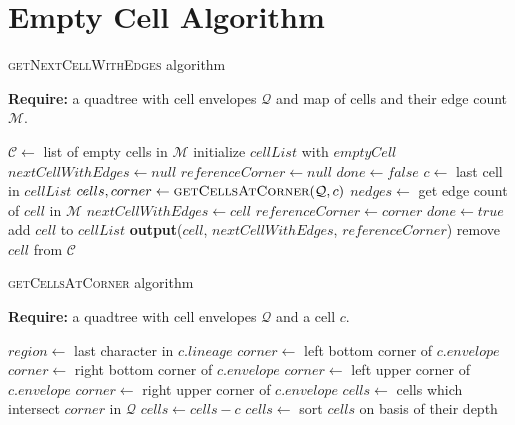 \section{Empty Cell Algorithm}\label{app:emptycells}
\begin{algorithm} \caption{\textsc{getNextCellWithEdges} algorithm}
    \textbf{Require:} a quadtree with cell envelopes $\mathcal Q$ and map of cells and their edge count $\mathcal M$.
    \begin{algorithmic}[1]
        \State $\mathcal C \gets $ list of empty cells in $\mathcal M$
            \State initialize $cellList$ with $emptyCell$ 
            \State $nextCellWithEdges \gets null$
            \State $referenceCorner \gets null$
            \State $done \gets false$
                \State $c \gets $ last cell in $cellList$ 
                \State $cells, corner \gets \textsc{getCellsAtCorner}(\mathcal Q, c)$ 
                    \State $nedges \gets$ get edge count of $cell$ in $\mathcal M$ 
                        \State $nextCellWithEdges \gets cell$
                        \State $referenceCorner \gets corner$
                        \State $done \gets true$
                    \Else
                        \State add $cell$ to $cellList$
                    \EndIf
                \EndFor
            \EndWhile
                \State \textbf{output}($cell$, $nextCellWithEdges$, $referenceCorner$)
                \State remove $cell$ from $\mathcal C$
            \EndFor
        \EndFor
    \EndFunction
    \end{algorithmic}
\end{algorithm}

\begin{algorithm} \caption{\textsc{getCellsAtCorner} algorithm}
    \textbf{Require:} a quadtree with cell envelopes $\mathcal Q$ and a cell $c$.
    \begin{algorithmic}[1]
        \State $region \gets $ last character in $c.lineage$
                \State $corner \gets$ left bottom corner of $c.envelope$
            \EndCase
                \State $corner \gets$ right bottom corner of $c.envelope$
            \EndCase
                \State $corner \gets$ left upper corner of $c.envelope$
            \EndCase
                \State $corner \gets$ right upper corner of $c.envelope$
            \EndCase
        \EndSwitch
        \State $cells \gets$ cells which intersect $corner$ in $\mathcal Q$
        \State $cells \gets cells - c$ 
        \State $cells \gets$ sort $cells$ on basis of their depth 
        \State {}
    \EndFunction
    \end{algorithmic}
\end{algorithm}
